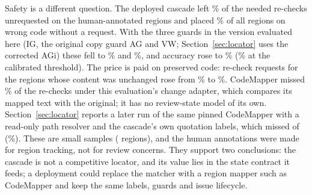 Safety is a different question. The deployed cascade left \cExtHumDepMiss\% of the needed re-checks unrequested on the human-annotated regions and placed \cExtHumDepSilent\% of all regions on wrong code without a request. With the three guards in the version evaluated here (IG, the original copy guard AG and VW; Section~\ref{sec:locator} uses the corrected AGi) these fell to \cExtHumAllMiss\% and \cExtHumAllSilent\%, and accuracy rose to \cExtHumAllAcc\% (\cExtHumAllCalAcc\% at the calibrated threshold). The price is paid on preserved code: re-check requests for the \cExtHumDepFalseN{} regions whose content was unchanged rose from \cExtHumDepFalse\% to \cExtHumAllFalse\%. CodeMapper missed \cExtHumCmMiss\% of the re-checks under this evaluation's change adapter, which compares its mapped text with the original; it has no review-state model of its own. Section~\ref{sec:locator} reports a later run of the same pinned CodeMapper with a read-only path resolver and the cascade's own quotation labels, which missed \wiHumCmQMissK{} of \wiHumCmQMissN{} (\wiHumCmQMiss\%). These are small samples (\cExtHumN{} regions), and the human annotations were made for region tracking, not for review concerns. They support two conclusions: the cascade is not a competitive locator, and its value lies in the state contract it feeds; a deployment could replace the matcher with a region mapper such as CodeMapper and keep the same labels, guards and issue lifecycle.
